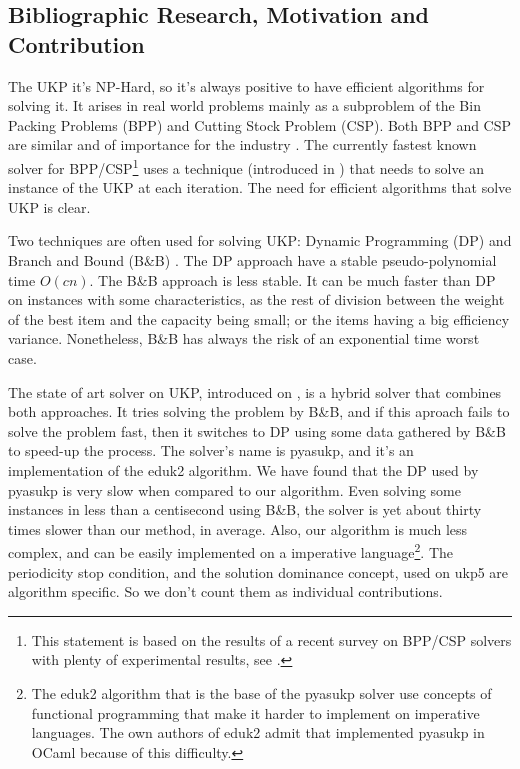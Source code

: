 \documentclass[runningheads,a4paper]{llncs}
\begin{document}
\subsection{Bibliographic Research, Motivation and Contribution}

The UKP it's NP-Hard, so it's always positive to have efficient algorithms for solving it. It arises in real world problems mainly as a subproblem of the Bin Packing Problems (BPP) and Cutting Stock Problem (CSP). Both BPP and CSP are similar and of importance for the industry \cite{CSURVEY} \cite{CGG} \cite{CGG2}. The currently fastest known solver for BPP/CSP\footnote{This statement is based on the results of a recent survey on BPP/CSP solvers with plenty of experimental results, see \cite{CSURVEY}.} uses a technique (introduced in \cite{CGG}) that needs to solve an instance of the UKP at each iteration. The need for efficient algorithms that solve UKP is clear.

Two techniques are often used for solving UKP: Dynamic Programming (DP) \cite{CGAR}\cite{CEDUK}\cite{CTCHU} and Branch and Bound (B\&B) \cite{CMTU2}. The DP approach have a stable pseudo-polynomial time \(O(c n)\). The B\&B approach is less stable. It can be much faster than DP on instances with some characteristics, as the rest of division between the weight of the best item and the capacity being small; or the items having a big efficiency variance. Nonetheless, B\&B has always the risk of an exponential time worst case.

The state of art solver on UKP, introduced on \cite{CPYA}, is a hybrid solver that combines both approaches. It tries solving the problem by B\&B, and if this aproach fails to solve the problem fast, then it switches to DP using some data gathered by B\&B to speed-up the process. The solver's name is pyasukp, and it's an implementation of the eduk2 algorithm. We have found that the DP used by pyasukp is very slow when compared to our algorithm. Even solving some instances in less than a centisecond using B\&B, the solver is yet about thirty times slower than our method, in average. Also, our algorithm is much less complex, and can be easily implemented on a imperative language\footnote{The eduk2 algorithm that is the base of the pyasukp solver use concepts of functional programming that make it harder to implement on imperative languages. The own authors of eduk2 admit that implemented pyasukp in OCaml because of this difficulty.}. The periodicity stop condition, and the solution dominance concept, used on ukp5 are algorithm specific. So we don't count them as individual contributions.
\end{document}
